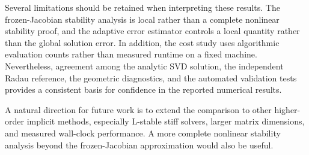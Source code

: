 Several limitations should be retained when interpreting these results.
The frozen-Jacobian stability analysis is local rather than a complete
nonlinear stability proof, and the adaptive error estimator controls a
local quantity rather than the global solution error. In addition, the
cost study uses algorithmic evaluation counts rather than measured
runtime on a fixed machine. Nevertheless, agreement among the analytic
SVD solution, the independent Radau reference, the geometric
diagnostics, and the automated validation tests provides a consistent
basis for confidence in the reported numerical results.

A natural direction for future work is to extend the comparison to
other higher-order implicit methods, especially L-stable stiff solvers,
larger matrix dimensions, and
measured wall-clock performance. A more complete nonlinear stability
analysis beyond the frozen-Jacobian approximation would also be useful.

